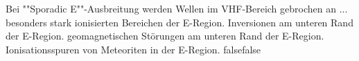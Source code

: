     {Bei ""Sporadic E""-Ausbreitung werden Wellen im VHF-Bereich gebrochen an ...}
    {besonders stark ionisierten Bereichen der E-Region.}
    {Inversionen am unteren Rand der E-Region.}
    {geomagnetischen Störungen am unteren Rand der E-Region.}
    {Ionisationsspuren von Meteoriten in der E-Region.}
    {false}{false}